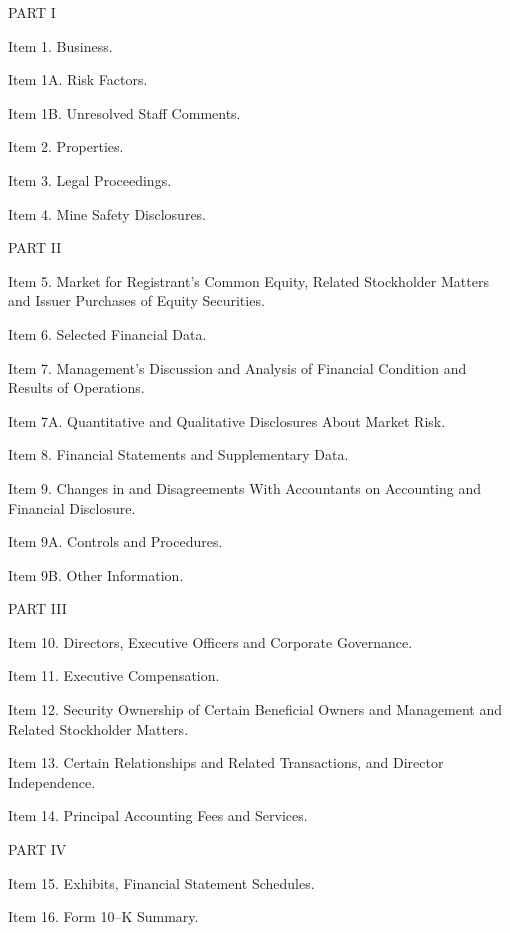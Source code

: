 \begin{addmargin}[1em]{1em}
    \begin{description}
        \item \begin{center}PART I\end{center}
        \item Item 1. Business.
        \item Item 1A. Risk Factors.
        \item Item 1B. Unresolved Staff Comments.
        \item Item 2. Properties.
        \item Item 3. Legal Proceedings.
        \item Item 4. Mine Safety Disclosures.
        \item \begin{center}PART II\end{center}
        \item Item 5. Market for Registrant’s Common Equity, Related Stockholder Matters and Issuer Purchases of Equity Securities.
        \item Item 6. Selected Financial Data.
        \item Item 7. Management’s Discussion and Analysis of Financial Condition and Results of Operations.
        \item Item 7A. Quantitative and Qualitative Disclosures About Market Risk.
        \item Item 8. Financial Statements and Supplementary Data.
        \item Item 9. Changes in and Disagreements With Accountants on Accounting and Financial Disclosure.
        \item Item 9A. Controls and Procedures.
        \item Item 9B. Other Information.
        \item \begin{center}PART III\end{center}
        \item Item 10. Directors, Executive Officers and Corporate Governance.
        \item Item 11. Executive Compensation.
        \item Item 12. Security Ownership of Certain Beneficial Owners and Management and Related Stockholder Matters.
        \item Item 13. Certain Relationships and Related Transactions, and Director Independence.
        \item Item 14. Principal Accounting Fees and Services.
        \item \begin{center}PART IV\end{center}
        \item Item 15. Exhibits, Financial Statement Schedules.
        \item Item 16. Form 10–K Summary.
    \end{description}
\end{addmargin}
